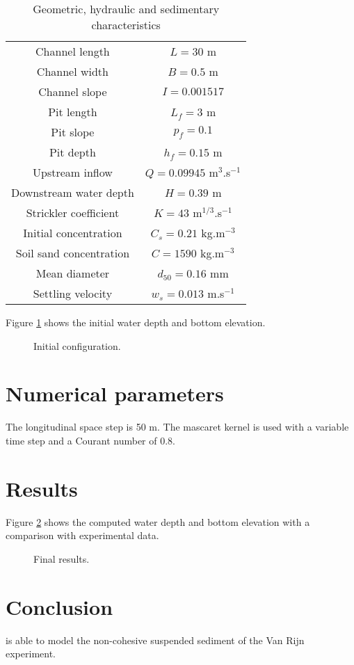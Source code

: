 \begin{table}[h!]
   \begin{center}
   \caption{Geometric, hydraulic and sedimentary characteristics}
       \begin{tabular}{|c|c|}
       \hline
   Channel length& $L=30$ m \\ 
   Channel width&$ B=0.5$ m \\
   Channel slope& $I=0.001517$ \\  
   Pit length& $L_f=3$ m \\
   Pit slope& $p_f=0.1$ \\
   Pit depth& $h_f=0.15$ m \\
       \hline
  Upstream inflow &$Q=0.09945$ m$^{3}$.s$^{-1}$ \\
  Downstream water depth &$ H=0.39$ m \\
  Strickler coefficient& $K=43$ m$^{1/3}$.s$^{-1}$\\
       \hline  
   Initial concentration& $C_s=0.21$ kg.m$^{-3}$ \\ 
   Soil sand concentration& $C=1590 $ kg.m$^{-3}$\\
   Mean diameter& $d_{50}=0.16$ mm \\
   Settling velocity&$w_s=0.013$ m.s$^{-1}$ \\
  \hline 
     \end{tabular}
     \end{center}
\end{table}

Figure \ref{fig:VR:init} shows the initial water depth and bottom 
elevation.

\begin{figure}[h]
 \centering
 \caption{Initial configuration.}
 \label{fig:VR:init}
\end{figure}

\section{Numerical parameters}

The longitudinal space step is 50 m. The mascaret kernel is used 
with a variable time step and a Courant number of 0.8.

\section{Results}

Figure \ref{fig:VR:final} shows the computed water depth and bottom
elevation with a comparison with experimental data.

\begin{figure}[h]
 \centering
 \caption{Final results.}
 \label{fig:VR:final}
\end{figure}

\section{Conclusion}

\courlis is able to model the non-cohesive suspended sediment
of the Van Rijn experiment.
